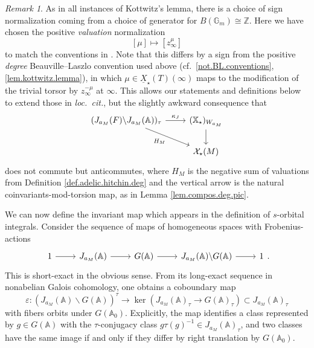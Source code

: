 \documentclass[openany]{amsbook}
\theoremstyle{definition}
\theoremstyle{remark}
\newtheorem{remark}[theorem]{Remark}
\numberwithin{equation}{section}
\newcommand{\Z}{\mathbb{Z}}
\newcommand{\G}{\mathbb{G}}
\newcommand{\cX}{\mathcal{X}}
\newcommand{\A}{\mathbb{A}}
\newcommand{\ul}[1]{\underline{#1}}
\renewcommand{\epsilon}{\varepsilon}
\renewcommand{\-}{\operatorname{-}}
\renewcommand{\A}{\mathbb{A}}
\newcommand{\bX}{\mathbb{X}}
\begin{document}
\begin{remark}\label{rmk.Kottwitz.signs}
    As in all instances of Kottwitz's lemma, there is a choice of sign normalization coming from a choice of generator for $B(\G_m) \cong \Z$. Here we have chosen the positive \emph{valuation} normalization
    $$
        [\mu] \mapsto [z_\infty^{\mu}]
    $$
    to match the conventions in \cite[Proposition 11.2.1]{CLII}. Note that this differs by a sign from the positive \emph{degree} Beauville--Laszlo convention used above (cf.\ \ref{not.BL.conventions}, \ref{lem.kottwitz.lemma}), in which $\mu \in \ul{X}_\star(T)(\infty)$ maps to the modification of the trivial torsor by $z_\infty^{-\mu}$ at $\infty$. This allows our statements and definitions below to extend those in \textit{loc.\ cit.}, but the slightly awkward consequence that 
    $$
        \begin{tikzcd}
             (J_{a_M}(F) \backslash J_{a_M}(\A))_\tau \ar[r, "\kappa_J"] \ar[dr, "H_M" below left] & (\bX_\star)_{W_{a_M}} \ar[d]\\ & \cX_\star(M)
        \end{tikzcd}
    $$
    does not commute but anticommutes, where $H_M$ is the negative sum of valuations from Definition \ref{def.adelic.hitchin.deg} and the vertical arrow is the natural coinvariants-mod-torsion map, as in Lemma \ref{lem.compos.deg.pic}.
\end{remark}

We can now define the invariant map which appears in the definition of $s$-orbital integrals. Consider the sequence of maps of homogeneous spaces with Frobenius-actions
$$
    \begin{tikzcd}[ampersand replacement=\&]
        1 \ar[r] \& J_{a_M}(\A) \ar[r] \& G(\A) \ar[r] \& J_{a_M}(\A) \backslash G(\A) \ar[r] \& 1
    \end{tikzcd}.
$$
This is short-exact in the obvious sense. From its long-exact sequence in nonabelian Galois cohomology, one obtains a coboundary map
$$
    \epsilon : (J_{a_M}(\A) \backslash G(\A))^{\tau} \to \ker(J_{a_M}(\A)_\tau \to G(\A)_\tau) \subset J_{a_M}(\A)_\tau
$$
with fibers orbits under $G(\A_0)$. Explicitly, the map identifies a class represented by $g \in G(\A)$ with the $\tau$-conjugacy class $g \tau(g)^{-1} \in J_{a_M}(\A)_\tau$, and two classes have the same image if and only if they differ by right translation by $G(\A_0)$. 
\end{document}
